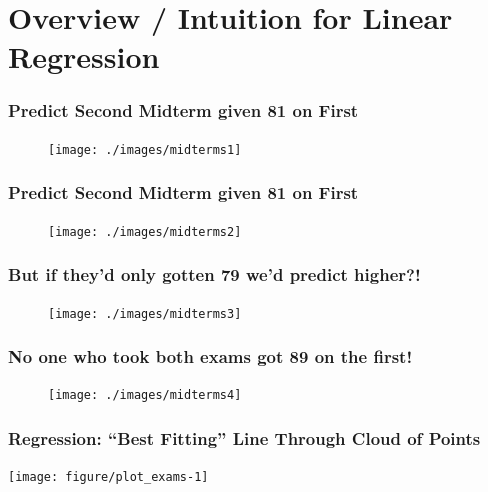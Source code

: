
\section{Overview / Intuition for Linear Regression}
\begin{frame}
\frametitle{Predict Second Midterm given 81 on First}
\begin{figure}
	\texttt{[image: ./images/midterms1]}
\end{figure}
\end{frame}
\begin{frame}
\frametitle{Predict Second Midterm given 81 on First}
\begin{figure}
	\texttt{[image: ./images/midterms2]}
\end{figure}
\end{frame}
\begin{frame}
\frametitle{But if they'd only gotten 79 we'd predict higher?!}
\begin{figure}
	\texttt{[image: ./images/midterms3]}
\end{figure}
\end{frame}
\begin{frame}
\frametitle{No one who took both exams got 89 on the first!}
\begin{figure}
	\texttt{[image: ./images/midterms4]}
\end{figure}
\end{frame}
\begin{frame}[fragile]
  \frametitle{Regression: ``Best Fitting'' Line Through Cloud of Points}
\begin{knitrout}
\color{fgcolor}
\texttt{[image: figure/plot\_exams-1]} 

\end{knitrout}
\end{frame}

